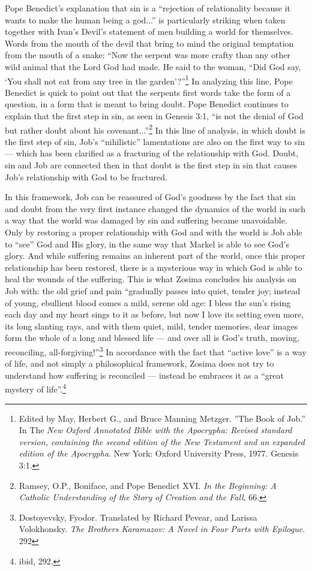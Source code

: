 Pope Benedict's explanation that sin is a ``rejection of relationality because it wants to make the human being a god...'' is particularly striking when taken together with Ivan's Devil's statement of men building a world for themselves. Words from the mouth of the devil that bring to mind the original temptation from the mouth of a snake: ``Now the serpent was more crafty than any other wild animal that the Lord God had made. He said to the woman, ``Did God say, `You shall not eat from any tree in the garden'?''\footnote{Edited by May, Herbert G., and Bruce Manning Metzger. ''The Book of Job.'' In The \emph{New Oxford Annotated Bible with the Apocrypha: Revised standard version, containing the second edition of the New Testament and an expanded edition of the Apocrypha}. New York: Oxford University Press, 1977. Genesis 3:1.} In analyzing this line, Pope Benedict is quick to point out that the serpents first words take the form of a question, in a form that is meant to bring doubt. Pope Benedict continues to explain that the first step in sin, as seen in Genesis 3:1, ``is not the denial of God but rather doubt about his covenant...''\footnote{Ramsey, O.P., Boniface, and Pope Benedict XVI. \emph{In the Beginning: A Catholic Understanding of the Story of Creation and the Fall}, 66.} In this line of analysis, in which doubt is the first step of sin, Job's ``nihilistic'' lamentations are also on the first way to sin --- which has been clarified as a fracturing of the relationship with God. Doubt, sin and Job are connected then in that doubt is the first step in sin that causes Job's relationship with God to be fractured. 

In this framework, Job can be reassured of God's goodness by the fact that sin and doubt from the very first instance changed the dynamics of the world in such a way that the world was damaged by sin and suffering became unavoidable. Only by restoring a proper relationship with God and with the world is Job able to ``see'' God and His glory, in the same way that Markel is able to see God's glory. And while suffering remains an inherent part of the world, once this proper relationship has been restored, there is a mysterious way in which God is able to heal the wounds of the suffering. This is what Zosima concludes his analysis on Job with: the old grief and pain ``gradually passes into quiet, tender joy; instead of young, ebullient blood comes a mild, serene old age: I bless the sun's rising each day and my heart sings to it as before, but now I love its setting even more, its long slanting rays, and with them quiet, mild, tender memories, dear images form the whole of a long and blessed life --- and over all is God's truth, moving, reconciling, all-forgiving!''\footnote{Dostoyevsky, Fyodor. Translated by Richard Pevear, and Larissa Volokhonsky. \emph{The Brothers Karamazov: A Novel in Four Parts with Epilogue}. 292} In accordance with the fact that ``active love'' is a way of life, and not simply a philosophical framework, Zosima does not try to understand how suffering is reconciled --- instead he embraces it as a ``great mystery of life''.\footnote{ibid, 292.}

